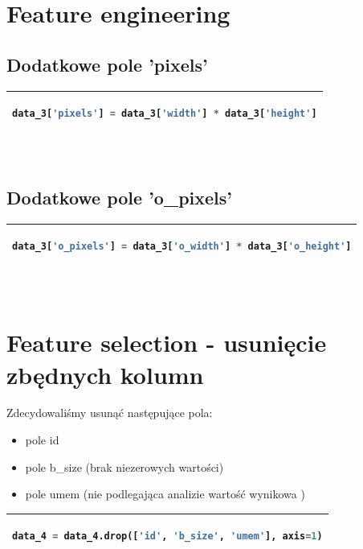 \documentclass[11pt, a4paper]{article}
\begin{document}
    \section{Feature engineering}
\subsection{Dodatkowe pole 'pixels'}
    \vspace{0.5cm} 
    \begin{tabular}{|l|}
        \hline
        \begin{lstlisting}[language=Python]
data_3['pixels'] = data_3['width'] * data_3['height']
        \end{lstlisting}
        \\ \hline
    \end{tabular}
    \vspace{0.5cm} \\

\subsection{Dodatkowe pole 'o\_pixels'}
    \vspace{0.5cm} 
    \begin{tabular}{|l|}
        \hline
        \begin{lstlisting}[language=Python]
data_3['o_pixels'] = data_3['o_width'] * data_3['o_height']
        \end{lstlisting}
        \\ \hline
    \end{tabular}
    \vspace{0.5cm} \\

\section{Feature selection - usunięcie zbędnych kolumn}

Zdecydowaliśmy usunąć następujące pola:
\begin{itemize}
\item pole id
\item pole b\_size (brak niezerowych wartości)
\item pole umem (nie podlegająca analizie wartość wynikowa )
\end{itemize}

    \vspace{0.5cm} 
    \begin{tabular}{|l|}
        \hline
        \begin{lstlisting}[language=Python]
data_4 = data_4.drop(['id', 'b_size', 'umem'], axis=1)
        \end{lstlisting}
        \\ \hline
    \end{tabular}
    \vspace{0.5cm} \\
\end{document}
